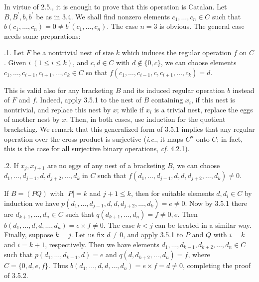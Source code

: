 \documentclass[a4paper,reqno]{amsart}\usepackage{amssymb,latexsym}
\theoremstyle{definition}
\theoremstyle{remark}
\numberwithin{equation}{section}
\numberwithin{theorem}{section}
\begin{document}
\bigskip

In virtue of 2.5., it is enough to prove that this operation is Catalan. Let
$B,B^{\prime},b,b^{\prime}$ be as in 3.4. We shall find nonzero elements
$c_{1},\ldots,c_{n}\in C$ such that $b(c_{1},\ldots,c_{n})=0\neq b^{\prime
}(c_{1},\ldots,c_{n})$. The case $n=3$ is obvious. The general case needs some preparations:

\smallskip

.1. Let $F$ be a nontrivial nest of size $k$ which induces the
regular operation $f$ on $C$. Given $i~(1\leq i\leq k)$, and $c,d\in C$ with
$d\notin\{0,c\}$, we can choose elements $c_{1},\ldots,c_{i-1},c_{i+1},\ldots,c_{k}\in C$ so that $f(c_{1},\ldots,c_{i-1},c,c_{i+1},\ldots,c_{k})=d$.

This is valid also for any bracketing $B$ and its induced regular operation
$b$ instead of $F$ and $f$. Indeed, apply 3.5.1 to the nest of $B$ containing
$x_{i}$, if this nest is nontrivial, and replace this nest by $x$; while if
$x_{i}$ is a trivial nest, replace the eggs of another nest by $x$. Then, in
both cases, use induction for the quotient bracketing. We remark that this
generalized form of 3.5.1 implies that any regular operation over the cross
product is surjective (\textit{i.e.}, it maps $C^{n}$ onto $C$; in fact, this
is the case for all surjective binary operations, \textit{cf.} 4.2.1).

\smallskip

.2. If $x_{j},x_{j+1}$ are no eggs of any nest of a bracketing
$B$, we can choose $d_{1},\ldots,d_{j-1},\allowbreak d,d_{j+2},\ldots,d_{k}$
in $C$ such that $f(d_{1},\ldots,d_{j-1},d,d,d_{j+2},\ldots,d_{k})\neq0$.

\smallskip

If $B=(PQ)$ with $|P|=k$ and $j+1\leq k$, then for suitable elements
$d,d_{i}\in C$ by induction we have $p(d_{1},\ldots,d_{j-1},d,d,d_{j+2},\ldots,d_{k})=e\neq0$. Now by 3.5.1 there are $d_{k+1},\ldots,d_{n}\in C$
such that $q(d_{k+1},\ldots,d_{n})=f\neq0,e$. Then $b(d_{1},\ldots
,d,d,\ldots,d_{n})=e\times f\neq0$. The case $k<j$ can be treated in a similar
way. Finally, suppose $k=j$. Let us fix $d\neq0$, and apply 3.5.1 to $P$ and
$Q$ with $i=k$ and $i=k+1$, respectively. Then we have elements $d_{1},\ldots,d_{k-1},d_{k+2},\ldots,d_{n}\in C$ such that $p(d_{1},\ldots
,d_{k-1},d)=e$ and $q(d,d_{k+2},\ldots,d_{n})=f$, where $C=\{0,d,e,f\}$. Thus
$b(d_{1},\ldots,d,d,\ldots,d_{n})=e\times f=d\neq0$, completing the proof of 3.5.2.
\end{document}
